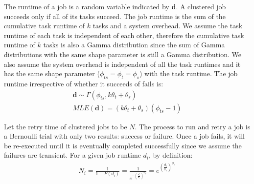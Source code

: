 The runtime of a job is a random variable indicated by $\bm d$. A clustered job succeeds only if all of its tasks succeed. The job runtime is the sum of the cumulative task runtime of $k$ tasks and a system overhead. We assume the task runtime of each task is independent of each other, therefore the cumulative task runtime of $k$ tasks is also a Gamma distribution since the sum of Gamma distributions with the same shape parameter is still a Gamma distribution. We also assume the system overhead is independent of all the task runtimes and it has the same shape parameter ($\phi_{ts}=\phi_{t}=\phi_{s}$) with the task runtime. 
The job runtime irrespective of whether it succeeds of fails is:
\begin{eqnarray}
\displaystyle
\bm{d}\sim\Gamma(\phi_{ts}, k\theta_t+\theta_s)\\
MLE(\bm{d})=\displaystyle{(k\theta_t+\theta_s) }{(\phi_{ts}-1)}
\label{eq:N}
\end{eqnarray}


Let the retry time of clustered jobs to be $N$. The process to run and retry a job is a Bernoulli trial with only two results: success or failure. Once a job fails, it will be re-executed until it is eventually completed successfully since we assume the failures are transient. For a given job runtime $d_i$, by definition:
\begin{eqnarray}
\displaystyle
N_i=\frac{1}{1-F(d_i)}=\frac{1}{e^{-(\displaystyle\frac{d_i}{\theta_{\gamma}})^{\phi_{\gamma}}}}=e^{(\displaystyle\frac{d_i}{\theta_{\gamma}})^{\phi_{\gamma}}} 
\label{eq:N_i}
\end{eqnarray}

